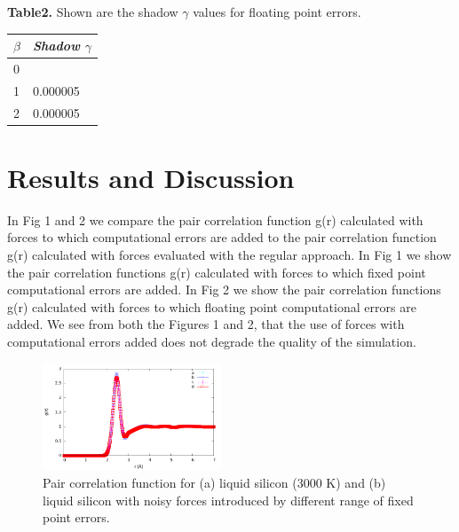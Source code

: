 \documentclass[aps,pre,twocolumn,showpacs,preprintnumbers,amsmath,amssymb]{revtex4-1}
\begin{document}
\textbf{Table2.} Shown are the shadow \(\gamma\) values for floating point errors.\\

\begin{table}[h!]
\begin{tabular}{|l|l|}
\hline
\textit{\(\beta\) } & \textit{Shadow \(\gamma\)} \\ \hline
0             &                       \\ \hline
1             & 0.000005              \\ \hline
2             & 0.000005              \\ \hline
\end{tabular}
\end{table}
 
\section{Results and Discussion}

 In Fig 1 and 2 we compare the pair correlation function g(r) calculated with forces to which computational errors are added to the pair correlation function g(r) calculated with forces evaluated with the regular approach. In Fig 1 we show the pair correlation functions g(r) calculated with forces to which fixed point computational errors are added. In Fig 2 we show the pair correlation functions g(r) calculated with forces to which floating point computational errors are added.  We see from both the Figures 1 and 2, that the use of forces with computational errors added does not degrade the quality of the simulation. 

\begin{figure}[h!]%
\begin{center}
\includegraphics[width=0.475\textwidth]
{rdffixedpt.pdf}
\end{center}
\caption{\label{Fig1}
Pair correlation function for (a) liquid silicon (3000 K) and (b) liquid silicon with noisy forces introduced by different range of fixed point errors.
} \end{figure}
\end{document}
